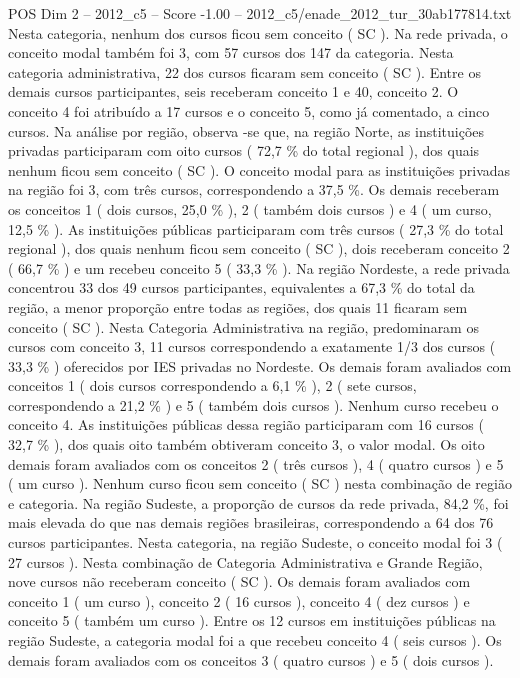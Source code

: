\begin{textsample}{POS Dim 2 – 2012\_c5 – Score -1.00 – 2012\_c5/enade\_2012\_tur\_30ab177814.txt}
Nesta categoria, nenhum dos cursos ficou sem conceito ( SC ).
Na rede privada, o conceito modal também foi 3, com 57 cursos dos 147 da categoria.
Nesta categoria administrativa, 22 dos cursos ficaram sem conceito ( SC ).
Entre os demais cursos participantes, seis receberam conceito 1 e 40, conceito 2.
O conceito 4 foi atribuído a 17 cursos e o conceito 5, como já comentado, a cinco cursos.
Na análise por região, observa -se que, na região Norte, as instituições privadas participaram com oito cursos ( 72,7 \% do total regional ), dos quais nenhum ficou sem conceito ( SC ).
O conceito modal para as instituições privadas na região foi 3, com três cursos, correspondendo a 37,5 \%.
Os demais receberam os conceitos 1 ( dois cursos, 25,0 \% ), 2 ( também dois cursos ) e 4 ( um curso, 12,5 \% ).
As instituições públicas participaram com três cursos ( 27,3 \% do total regional ), dos quais nenhum ficou sem conceito ( SC ), dois receberam conceito 2 ( 66,7 \% ) e um recebeu conceito 5 ( 33,3 \% ).
Na região Nordeste, a rede privada concentrou 33 dos 49 cursos participantes, equivalentes a 67,3 \% do total da região, a menor proporção entre todas as regiões, dos quais 11 ficaram sem conceito ( SC ).
Nesta Categoria Administrativa na região, predominaram os cursos com conceito 3, 11 cursos correspondendo a exatamente 1/3 dos cursos ( 33,3 \% ) oferecidos por IES privadas no Nordeste.
Os demais foram avaliados com conceitos 1 ( dois cursos correspondendo a 6,1 \% ), 2 ( sete cursos, correspondendo a 21,2 \% ) e 5 ( também dois cursos ).
Nenhum curso recebeu o conceito 4.
As instituições públicas dessa região participaram com 16 cursos ( 32,7 \% ), dos quais oito também obtiveram conceito 3, o valor modal.
Os oito demais foram avaliados com os conceitos 2 ( três cursos ), 4 ( quatro cursos ) e 5 ( um curso ).
Nenhum curso ficou sem conceito ( SC ) nesta combinação de região e categoria.
Na região Sudeste, a proporção de cursos da rede privada, 84,2 \%, foi mais elevada do que nas demais regiões brasileiras, correspondendo a 64 dos 76 cursos participantes.
Nesta categoria, na região Sudeste, o conceito modal foi 3 ( 27 cursos ).
Nesta combinação de Categoria Administrativa e Grande Região, nove cursos não receberam conceito ( SC ).
Os demais foram avaliados com conceito 1 ( um curso ), conceito 2 ( 16 cursos ), conceito 4 ( dez cursos ) e conceito 5 ( também um curso ).
Entre os 12 cursos em instituições públicas na região Sudeste, a categoria modal foi a que recebeu conceito 4 ( seis cursos ).
Os demais foram avaliados com os conceitos 3 ( quatro cursos ) e 5 ( dois cursos ).

\end{textsample}
